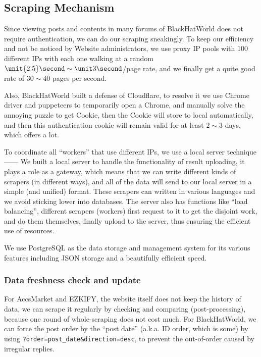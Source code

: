 \documentclass{article}
\begin{document}
	\subsection{Scraping Mechanism}

	Since viewing posts and contents in many forums of BlackHatWorld does not require authentication, we can do our scraping sneakingly. To keep our efficiency and not be noticed by Website administrators, we use proxy IP pools with 100 different IPs with each one walking at a random $\unit {2.5} \second \sim \unit 3 \second$/page rate, and we finally get a quite good rate of $30 \sim 40$ pages per second.

	Also, BlackHatWorld built a defense of Cloudflare, to resolve it we use Chrome driver and puppeteers to temporarily open a Chrome, and manually solve the annoying puzzle to get Cookie, then the Cookie will store to local automatically, and then this authentication cookie will remain valid for at least $2 \sim 3$ days, which offers a lot.

	To coordinate all ``workers'' that use different IPs, we use a local server technique ------ We built a local server to handle the functionality of result uploading, it plays a role as a gateway, which means that we can write different kinds of scrapers (in different ways), and all of the data will send to our local server in a simple (and unified) format. These scrapers can written in various languages and we avoid sticking lower into databases. The server also has functions like ``load balancing'', different scrapers (workers) first request to it to get the disjoint work, and do them themselves, finally upload to the server, thus ensuring the efficient use of resources.

	We use PostgreSQL as the data storage and management system for its various features including JSON storage and a beautifully efficient speed.

	\subsubsection{Data freshness check and update}

	For AccsMarket and EZKIFY, the website itself does not keep the history of data, we can scrape it regularly by checking and comparing (post-processing), because one round of whole-scraping does not cost much. For BlackHatWorld, we can force the post order by the ``post date'' (a.k.a. ID order, which is some) by using \verb!?order=post_date&direction=desc!, to prevent the out-of-order caused by irregular replies.
\end{document}
